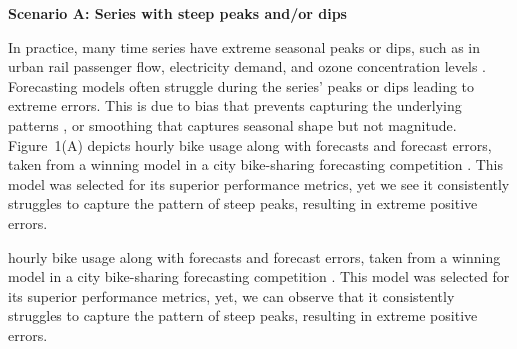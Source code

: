 \documentclass[12pt]{article}
\newenvironment{scenario}[1]{%
  \par\vspace{1ex}\noindent\textbf{#1}\par\vspace{0.5ex}}{\par}
\begin{document}

\begin{scenario}{Scenario A: Series with steep peaks and/or dips}
In practice, many time series have extreme seasonal peaks or dips, such as in urban rail passenger flow, electricity demand, and ozone concentration levels  \citep{li2024, amaraouali2023, marvin2022}. Forecasting models often struggle during the series' peaks or dips leading to extreme errors. This is due to bias that prevents capturing the underlying patterns \citep{lin2023}, or smoothing that captures seasonal shape but not magnitude. Figure~1(A) depicts hourly bike usage along with forecasts and forecast errors, taken from a winning model in a city bike-sharing forecasting competition \citep{mohit2020}. This model was selected for its superior performance metrics, yet we see it consistently struggles to capture the pattern of steep peaks, resulting in extreme positive errors.
\end{scenario}

hourly bike usage along with forecasts and forecast errors, taken from a winning model in a city bike-sharing forecasting competition \citep{mohit2020}. This model was selected for its superior performance metrics, yet, we can observe that it consistently struggles to capture the pattern of steep peaks, resulting in extreme positive errors.
\end{document}
